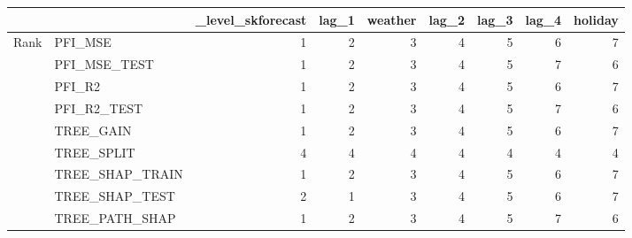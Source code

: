 \begin{tabular}{llrrrrrrr}
\toprule
 &  & _level_skforecast & lag_1 & weather & lag_2 & lag_3 & lag_4 & holiday \\
\midrule
\multirow[t]{9}{*}{Rank} & PFI_MSE & 1 & 2 & 3 & 4 & 5 & 6 & 7 \\
 & PFI_MSE_TEST & 1 & 2 & 3 & 4 & 5 & 7 & 6 \\
 & PFI_R2 & 1 & 2 & 3 & 4 & 5 & 6 & 7 \\
 & PFI_R2_TEST & 1 & 2 & 3 & 4 & 5 & 7 & 6 \\
 & TREE_GAIN & 1 & 2 & 3 & 4 & 5 & 6 & 7 \\
 & TREE_SPLIT & 4 & 4 & 4 & 4 & 4 & 4 & 4 \\
 & TREE_SHAP_TRAIN & 1 & 2 & 3 & 4 & 5 & 6 & 7 \\
 & TREE_SHAP_TEST & 2 & 1 & 3 & 4 & 5 & 6 & 7 \\
 & TREE_PATH_SHAP & 1 & 2 & 3 & 4 & 5 & 7 & 6 \\
\cline{1-9}
\bottomrule
\end{tabular}
